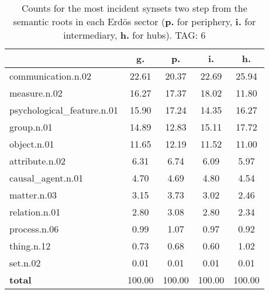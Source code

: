 \begin{table}[h!]
\begin{center}
\begin{tabular}{| l || c | c | c | c |}\hline
 & {\bf g.} & {\bf p.} & {\bf i.} & {\bf h.} \\\hline\hline
communication.n.02 & 22.61  & 20.37  & 22.69  & 25.94 \\\hline
measure.n.02 & 16.27  & 17.37  & 18.02  & 11.80 \\\hline
psychological\_feature.n.01 & 15.90  & 17.24  & 14.35  & 16.27 \\\hline
group.n.01 & 14.89  & 12.83  & 15.11  & 17.72 \\\hline
object.n.01 & 11.65  & 12.19  & 11.52  & 11.00 \\\hline
attribute.n.02 & 6.31  & 6.74  & 6.09  & 5.97 \\\hline
causal\_agent.n.01 & 4.70  & 4.69  & 4.80  & 4.54 \\\hline
matter.n.03 & 3.15  & 3.73  & 3.02  & 2.46 \\\hline
relation.n.01 & 2.80  & 3.08  & 2.80  & 2.34 \\\hline
process.n.06 & 0.99  & 1.07  & 0.97  & 0.92 \\\hline
thing.n.12 & 0.73  & 0.68  & 0.60  & 1.02 \\\hline
set.n.02 & 0.01  & 0.01  & 0.01  & 0.01 \\\hline\hline
{{\bf total}} & 100.00  & 100.00  & 100.00  & 100.00 \\\hline
\end{tabular}
\caption{Counts for the most incident synsets two step from the semantic roots in each Erd\"os sector ({\bf p.} for periphery, {\bf i.} for intermediary, {\bf h.} for hubs). TAG: 6}
\end{center}
\end{table}